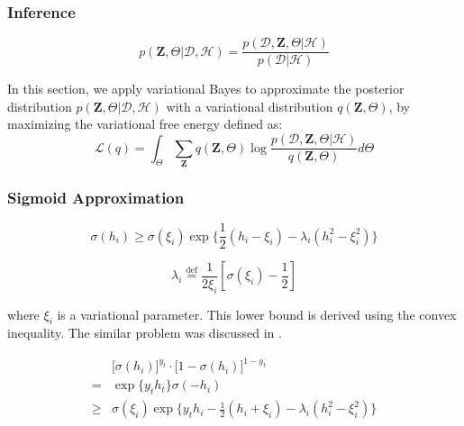 \subsubsection{Inference}

\begin{equation}
p(\bm{Z},\Theta|\mathcal{D},\mathcal{H}) = \frac{p(\mathcal{D},\bm{Z},\Theta|\mathcal{H})}{p(\mathcal{D}|\mathcal{H})}
\end{equation}

In this section, we apply variational Bayes to approximate the posterior distribution $p(\bm{Z},\Theta|\mathcal{D},\mathcal{H})$ with a variational distribution $q(\bm{Z},\Theta)$, by maximizing the variational free energy defined as:
\begin{equation}
\mathcal{L}(q)= \int_\Theta \sum_{\bm{Z}} q(\bm{Z},\Theta) \log\frac{p(\mathcal{D},\bm{Z},\Theta|\mathcal{H})}{q(\bm{Z},\Theta)}d\Theta
\end{equation}

\subsubsection{Sigmoid Approximation}

\begin{equation}
\sigma(h_{i}) \geq \sigma(\xi_{i})\exp\big\{\frac{1}{2}(h_{i}-\xi_{i})-\lambda_{i}(h_{i}^2-\xi_{i}^2)\big\}
\end{equation}

$$\lambda_{i}\overset{\mathrm{def}}=\frac{1}{2\xi_{i}}[\sigma(\xi_{i})-\frac{1}{2}]$$

\noindent where $\xi_{i}$ is a variational parameter. This lower bound is derived using the convex inequality. The similar problem was discussed in \cite{jaakkola1997variational,jordan1999introduction}.

\begin{align}
& \big[\sigma(h_{i})\big]^{y_t} \cdot  \big[1-\sigma(h_{i}) \big]^{1-y_t} \\
= & \exp\big\{ y_t h_t \big\} \sigma(-h_{i}) \\
\geq & \sigma(\xi_{i})\exp\big\{y_t h_{i}-\frac{1}{2}(h_{i}+\xi_{i})-\lambda_{i}(h_{i}^2-\xi_{i}^2)\big\}
\end{align}




